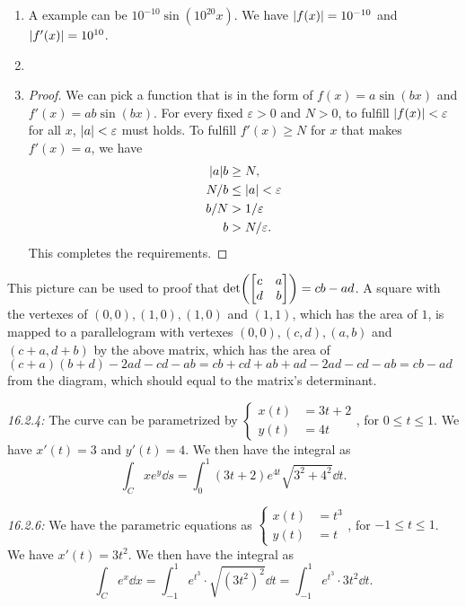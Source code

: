 \documentclass[8pt,twocolumn]{article}
\begin{document}
\begin{Answer}[number=26]
  \begin{enumerate}
    \item A example can be $10^{-10}\sin(10^{20}x)$. We have
      $\abs{f(x)}=10^{-10}$ and $\abs{f'(x)}=10^{10}$.
    \item %
    \item \begin{proof}
        We can pick a function that is in the form of $f(x) = a\sin(bx)$ and
        $f'(x)=ab\sin(bx)$. For every fixed $\varepsilon> 0$ and $N> 0$, to
        fulfill $\abs{f(x)}<\varepsilon$ for all $x$, $\abs{a} < \varepsilon$
        must holds. To fulfill $f'(x)\ge N$ for $x$ that makes $f'(x)=a$,
        we have
        \begin{align*}
          \abs{a}b &\ge N, \\
          N/b &\le \abs{a} < \varepsilon  \\
          b/N &> 1/\varepsilon  \\
          b &> N/\varepsilon.
        \end{align*}
        This completes the requirements.
    \end{proof}
  \end{enumerate}
\end{Answer}

\begin{Answer}[number=27]
  This picture can be used to proof that \(\det(\mqty[c & a \\ d & b]) =
  cb-ad\). A square with the
  vertexes of $(0,0), (1, 0), (1, 0)$ and $(1,1)$, which has the area of $1$,
  is mapped to a parallelogram with vertexes $(0,0), (c,d), (a, b)$ and $(c+a,
  d+b)$ by the above matrix, which has the area of $(c+a)(b+d)-2ad-cd-ab=cb+cd+ab+ad-2ad-cd-ab =
  cb-ad$ from the diagram, which should equal to the matrix's determinant.
\end{Answer}

\begin{Answer}[number=28]
  \emph{16.2.4:} The curve can be parametrized by \(\begin{cases}
    x(t) &= 3t+2\\
    y(t) &= 4t
  \end{cases}\), for $0\le t\le 1$. We have $x'(t) = 3$ and $y'(t) = 4$.
  We then have the integral as
  \[
    \int_C xe^y\dd{s} = \int_0^1 (3t+2)e^{4t}\sqrt{3^2+4^2}\dd{t}.
  \]

  \emph{16.2.6:} We have the parametric equations as \(\begin{cases}
    x(t) &= t^3\\
    y(t) &= t
  \end{cases}\), for $-1\le t\le 1$. We have $x'(t) = 3t^2$.
  We then have the integral as
  \[
    \int_C e^x\dd{x} = \int_{-1}^1 e^{t^3} \cdot \sqrt{(3t^2)^2}\dd{t}= \int_{-1}^1 e^{t^3} \cdot 3t^2\dd{t}.
  \]
\end{Answer}
\end{document}
